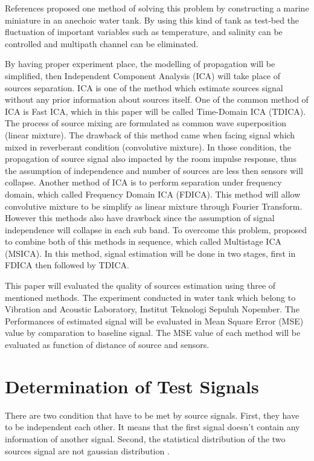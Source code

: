 \documentclass[a4paper]{jpconf}
\begin{document}
References \cite{1} proposed one method of solving this problem by constructing a marine miniature in an anechoic water tank. By using this kind of tank as test-bed the fluctuation of important variables such as temperature, and salinity can be controlled and multipath channel can be eliminated.

By having proper experiment place, the modelling of propagation will be simplified, then Independent Component Analysis (ICA) will take place of sources separation. ICA is one of the method which estimate sources signal without any prior information about sources itself. One of the common method of ICA is Fast ICA, which in this paper will be called Time-Domain ICA (TDICA). The process of source mixing are formulated as common wave superposition (linear mixture). The drawback of this method came when facing signal which mixed in reverberant condition (convolutive mixture). In those condition, the propagation of source signal also impacted by the room impulse response, thus the assumption of independence and number of sources are less then sensors will collapse. Another method of ICA is to perform separation under frequency domain, which called Frequency Domain ICA (FDICA). This method will allow convolutive mixture to be simplify as linear mixture through Fourier Transform. However this methods also have drawback since the assumption of signal independence will collapse in each sub band. To overcome this problem, \cite{2} proposed to combine both of this methods in sequence, which called Multistage ICA (MSICA). In this method, signal estimation will be done in two stages, first in FDICA then followed by TDICA.

This paper will evaluated the quality of sources estimation using three of mentioned methods. The experiment conducted in water tank which belong to Vibration and Acoustic Laboratory, Institut Teknologi Sepuluh Nopember. The Performances of estimated signal will be evaluated in Mean Square Error (MSE) value by comparation to baseline signal. The MSE value of each method will be evaluated as function of distance of source and sensors.

\section{Determination of Test Signals}
There are two condition that have to be met by source signals. First, they have to be independent each other. It means that the first signal doesn’t contain any information of another signal. Second, the statistical distribution of the two sources signal are not gaussian distribution \cite{3}.
\end{document}
